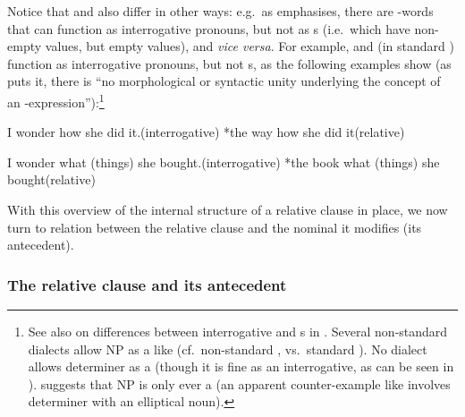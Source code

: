 \documentclass[output=paper,nonflat,draftmode]{./langsci/langscibook}
\begin{document}
Notice that  and  also differ in other ways: e.g.\ as
\cite[490--493]{Sag:10b} emphasises, there are -words that can function as
interrogative pronouns, but not as s (i.e.\ which have non-empty
 values, but empty  values), and \emph{vice versa}. For example,
 and (in standard )  function as interrogative pronouns,
but not s, as the following examples show (as \citealt[493]{Sag:10b} puts it, there
is ``no morphological or syntactic unity underlying the concept of an 
-expression''):\footnote{See also \cite[81--85]{Mueller99b} on differences
  between interrogative and s in . Several non-standard 
  dialects allow NP  as a  like  (cf.\ non-standard
  , vs.\ standard ). No
  dialect allows determiner  as a  (though it is fine as an
  interrogative, as can be seen in ). \cite[491, note 10]{Sag:10b} suggests
  that NP  is only ever a  (an apparent counter-example like
    involves determiner  with an elliptical noun).}
\begin{exe}\ex\begin{xlist}
  \ex\label{x:rc-31} I wonder how she did it.\hfill(interrogative)
  \ex\label{x:rc-32} *the way how she did it\hfill(relative)
\end{xlist}\end{exe}
\begin{exe}\ex\begin{xlist}
  \ex\label{x:rc-33} I wonder what (things) she bought.\hfill(interrogative)
  \ex\label{x:rc-34} *the book what (things) she bought\hfill(relative)
\end{xlist}\end{exe}

With this overview of the internal structure of a relative clause in place, we now turn to
relation between the relative clause and the nominal it modifies (its antecedent).

\subsubsection{The relative clause and its antecedent}
\label{sec:rc-relative-clause-ante}
\end{document}
